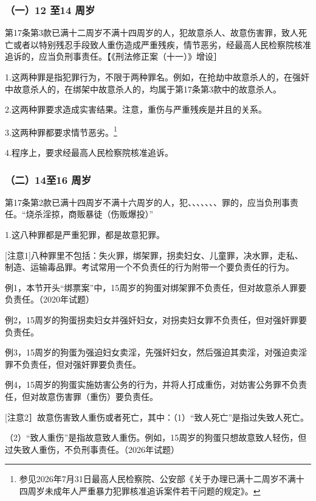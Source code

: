 \subsubsection*{（一）12 至14 周岁}

第17条第3款已满十二周岁不满十四周岁的人，犯故意杀人、故意伤害罪，致人死亡或者以特别残忍手段致人重伤造成严重残疾，情节恶劣，经最高人民检察院核准追诉的，应当负刑事责任。【《刑法修正案（十一）》增设］

1.这两种罪是指犯罪行为，不限于两种罪名。例如，在抢劫中故意杀人的，在强奸中故意杀人的，在绑架中故意杀人的，均属于第17条第3款中的故意杀人。

2.这两种罪要求造成实害结果。注意，重伤与严重残疾是并且的关系。

3.这两种罪都要求情节恶劣。\footnote{参见2026年7月31日最高人民检察院、公安部《关于办理已满十二周岁不满十四周岁未成年人严重暴力犯罪核准追诉案件若干问题的规定》。}

4.程序上，要求经最高人民检察院核准追诉。

\subsubsection*{（二）14至16 周岁}

第17条第2款已满十四周岁不满十六周岁的人，犯、、、、、、、罪的，应当负刑事责任。“烧杀淫掠，商贩暴徒（伤贩爆投）”

1.这八种罪都是严重犯罪，都是故意犯罪。

[注意1]八种罪里不包括：失火罪，绑架罪，拐卖妇女、儿童罪，决水罪，走私、制造、运输毒品罪。考试常用一个不负责任的行为附带一个要负责任的行为。

例1，本节开头“绑票案”中，15周岁的狗蛋对绑架罪不负责任，但对故意杀人罪要负责任。（2020年试题）

例2，15周岁的狗蛋拐卖妇女并强奸妇女，对拐卖妇女罪不负责任，但对强奸罪要负责任。

例3，15周岁的狗蛋为强迫妇女卖淫，先强奸妇女，然后强迫其卖淫，对强迫卖淫罪不负责任，但对强奸罪要负责任。

例4，15周岁的狗蛋实施妨害公务的行为，并将人打成重伤，对妨害公务罪不负责任，但对故意伤害罪（重伤）要负责任。

[注意2］故意伤害致人重伤或者死亡，其中：（1）“致人死亡”是指过失致人死亡。

（2）“致人重伤”是指故意致人重伤。例如，15周岁的狗蛋只想故意致人轻伤，但过失致人重伤，不负刑事责任。（2026年试题）


